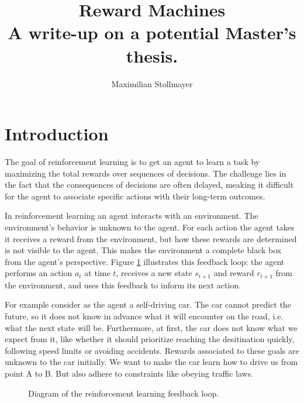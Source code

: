 \documentclass[12pt, a4paper]{article}
\title{{\Huge Reward Machines} \\ A write-up on a potential Master's thesis.}
\author{Maximilian Stollmayer}
\date{}
\begin{document}
\maketitle

\section*{Introduction}

The goal of reinforcement learning is to get an agent to learn a task by maximizing the total rewards over sequences of decisions. The challenge lies in the fact that the consequences of decisions are often delayed, meaking it difficult for the agent to associate specific actions with their long-term outcomes.

In reinforcement learning an agent interacts with an environment. The environment's behavior is unknown to the agent. For each action the agent takes it receives a reward from the environment, but how these rewards are determined is not visible to the agent. This makes the environment a complete black box from the agent's perspective. Figure \ref{fig:rl_framework} illustrates this feedback loop: the agent performs an action $a_t$ at time $t$, receives a new state $s_{t+1}$ and reward $r_{t+1}$ from the environment, and uses this feedback to inform its next action.

For example consider as the agent a self-driving car. The car cannot predict the future, so it does not know in advance what it will encounter on the road, i.e. what the next state will be. Furthermore, at first, the car does not know what we expect from it, like whether it should prioritize reaching the desitination quickly, following speed limits or avoiding accidents. Rewards associated to these goals are unknown to the car initially. We want to make the car learn how to drive us from point A to B. But also adhere to constraints like obeying traffic laws.

\usetikzlibrary{graphs, quotes}
\begin{figure}[ht!]
	\centering
	\caption{Diagram of the reinforcement learning feedback loop.}
	\label{fig:rl_framework}
\end{figure}
\end{document}
